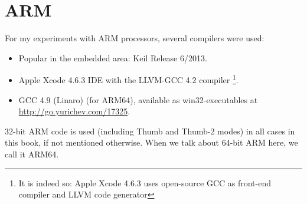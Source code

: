 \section{ARM}
\label{sec:hw_ARM}

\index{\idevices}
For my experiments with ARM processors, several compilers were used:

\begin{itemize}
\item Popular in the embedded area: Keil Release 6/2013.

\item Apple Xcode 4.6.3 IDE with the LLVM-GCC 4.2 compiler
\footnote{It is indeed so: Apple Xcode 4.6.3 uses open-source GCC as front-end compiler and LLVM 
code generator}.

\item GCC 4.9 (Linaro) (for ARM64), available as win32-executables at \url{http://go.yurichev.com/17325}.

\end{itemize}

32-bit ARM code is used (including Thumb and Thumb-2 modes) in all cases in this book, if not mentioned otherwise.
When we talk about 64-bit ARM here, we call it ARM64.







